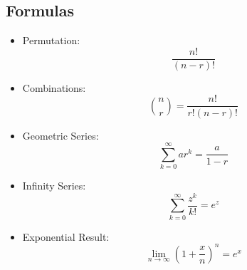 \documentclass[12pt]{article}
\begin{document}
\begin{multicols*}{4}
    \section{Formulas}
    \begin{tcolorbox}[title=Formulas]
        \begin{itemize}[leftmargin=*]
            \item Permutation:
                  $$\frac{n!}{(n-r)!}$$
            \item Combinations:
                  $$\binom{n}{r}=\frac{n!}{r!(n-r)!}$$
            \item Geometric Series:
                  $$\sum_{k=0}^\infty ar^{k}=\frac{a}{1-r}$$
            \item Infinity Series:
                  $$\sum_{k=0}^\infty\frac{z^k}{k!}=e^z$$
            \item Exponential Result:
                  $$\lim_{n\to\infty}\left(1+\frac{x}{n}\right)^n=e^x$$
        \end{itemize}
    \end{tcolorbox}

\end{multicols*}
\end{document}
